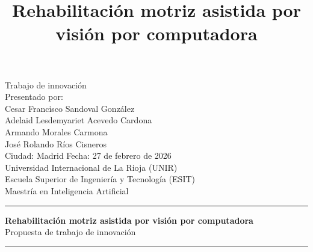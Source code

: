 \documentclass[11pt,a4paper]{article}
\title{Rehabilitación motriz asistida por visión por computadora}
\author{}
\date{}
\begin{document}
\begin{titlepage}
\thispagestyle{empty}
\centering
\vspace*{1cm}
{\sffamily\fontsize{12}{16}\selectfont
Trabajo de innovación\\
\vspace{0.3cm}
Presentado por:\\
\vspace{0.4cm}
Cesar Francisco Sandoval González\\
Adelaid Lesdemyariet Acevedo Cardona\\
Armando Morales Carmona\\
José Rolando Ríos Cisneros\\
\vspace{0.5cm}
Ciudad: Madrid \quad Fecha: 27 de febrero de 2026\\
}
\vspace{1.2cm}
{\sffamily\fontsize{14}{18}\selectfont
Universidad Internacional de La Rioja (UNIR)\\
\vspace{0.25cm}
Escuela Superior de Ingeniería y Tecnología (ESIT)\\
\vspace{0.4cm}
Maestría en Inteligencia Artificial\\
}
\vspace{1.5cm}
\rule{\textwidth}{0.8pt}
\vspace{0.6cm}
{\sffamily\fontsize{15}{20}\selectfont\bfseries
Rehabilitación motriz asistida por visión por computadora\\
}
\vspace{0.3cm}
{\sffamily\fontsize{10}{13}\selectfont
Propuesta de trabajo de innovación\\
}
\vspace{0.4cm}
\rule{\textwidth}{0.8pt}
\vfill
\end{titlepage}

\clearpage
{}
\setcounter{page}{1}
\end{document}
